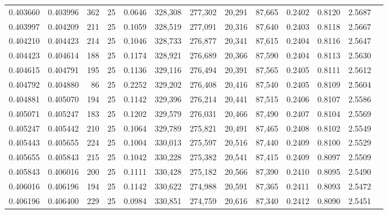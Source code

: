 \begin{tabular}{rrrrrrrrrrrrr}
0.403660 & 0.403996 &   362 &  25 &                                     0.0646 & 328,308 & 277,302 &  20,291 &  87,665 & 0.2402 & 0.8120 & 2.5687 \\
0.403997 & 0.404209 &   211 &  25 &                                     0.1059 & 328,519 & 277,091 &  20,316 &  87,640 & 0.2403 & 0.8118 & 2.5667 \\
0.404210 & 0.404423 &   214 &  25 &                                     0.1046 & 328,733 & 276,877 &  20,341 &  87,615 & 0.2404 & 0.8116 & 2.5647 \\
0.404423 & 0.404614 &   188 &  25 &                                     0.1174 & 328,921 & 276,689 &  20,366 &  87,590 & 0.2404 & 0.8113 & 2.5630 \\
0.404615 & 0.404791 &   195 &  25 &                                     0.1136 & 329,116 & 276,494 &  20,391 &  87,565 & 0.2405 & 0.8111 & 2.5612 \\
0.404792 & 0.404880 &    86 &  25 &                                     0.2252 & 329,202 & 276,408 &  20,416 &  87,540 & 0.2405 & 0.8109 & 2.5604 \\
0.404881 & 0.405070 &   194 &  25 &                                     0.1142 & 329,396 & 276,214 &  20,441 &  87,515 & 0.2406 & 0.8107 & 2.5586 \\
0.405071 & 0.405247 &   183 &  25 &                                     0.1202 & 329,579 & 276,031 &  20,466 &  87,490 & 0.2407 & 0.8104 & 2.5569 \\
0.405247 & 0.405442 &   210 &  25 &                                     0.1064 & 329,789 & 275,821 &  20,491 &  87,465 & 0.2408 & 0.8102 & 2.5549 \\
0.405443 & 0.405655 &   224 &  25 &                                     0.1004 & 330,013 & 275,597 &  20,516 &  87,440 & 0.2409 & 0.8100 & 2.5529 \\
0.405655 & 0.405843 &   215 &  25 &                                     0.1042 & 330,228 & 275,382 &  20,541 &  87,415 & 0.2409 & 0.8097 & 2.5509 \\
0.405843 & 0.406016 &   200 &  25 &                                     0.1111 & 330,428 & 275,182 &  20,566 &  87,390 & 0.2410 & 0.8095 & 2.5490 \\
0.406016 & 0.406196 &   194 &  25 &                                     0.1142 & 330,622 & 274,988 &  20,591 &  87,365 & 0.2411 & 0.8093 & 2.5472 \\
0.406196 & 0.406400 &   229 &  25 &                                     0.0984 & 330,851 & 274,759 &  20,616 &  87,340 & 0.2412 & 0.8090 & 2.5451 \\

\end{tabular}
